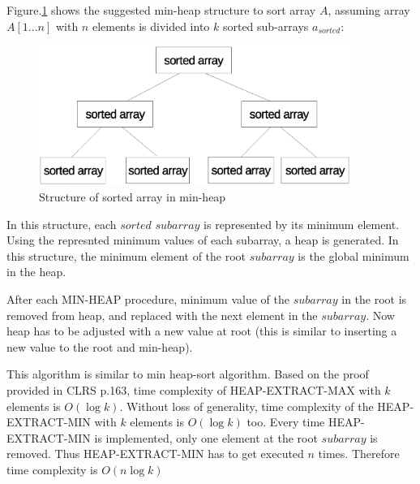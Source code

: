 \documentclass[11pt]{article}
\begin{document}
\begin{enumerate}
	
	Figure.\ref{fig:prob-6-5-9} shows the suggested min-heap structure to sort array $A$, assuming array $A[1...n]$ with $n$ elements is divided into $k$ sorted sub-arrays $a_{sorted}$: 

	\begin{figure}[h!]
		\centerline{\includegraphics[width=4in]{prob-6-5-9.eps}}
		\caption{Structure of sorted array in min-heap}
		\label{fig:prob-6-5-9}
	\end{figure}
	
	In this structure, each $sorted$ $subarray$ is represented by its minimum element. Using the represnted minimum values of each subarray, a heap is generated. In this structure, the minimum element of the root $subarray$ is the global minimum in the heap.
	
	After each MIN-HEAP procedure, minimum value of the $subarray$ in the root is removed from heap, and replaced with the next element in the $subarray$. Now heap has to be adjusted with a new value at root (this is similar to inserting a new value to the root and min-heap).  	
	
	This algorithm is similar to min heap-sort algorithm. Based on the proof provided in CLRS p.163, time complexity of HEAP-EXTRACT-MAX with $k$ elements is $O(\log{k})$. Without loss of generality, time complexity of the HEAP-EXTRACT-MIN with $k$ elements is $O(\log{k})$ too. Every time HEAP-EXTRACT-MIN is implemented, only one element at the root $subarray$ is removed. Thus HEAP-EXTRACT-MIN has to get executed $n$ times. Therefore time complexity is $O(n\log{k})$   
	
	

	
	
	   




















































   
\end{enumerate}
\end{document}
